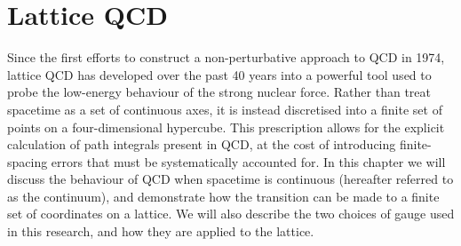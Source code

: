 
\chapter{Lattice QCD}

\ifpdf
    \graphicspath{{Chapter2/Figs/Raster/}{Chapter2/Figs/PDF/}{Chapter2/Figs/}}
\else
    \graphicspath{{Chapter2/Figs/Vector/}{Chapter2/Figs/}}
\fi
Since the first efforts to construct a non-perturbative approach to QCD in 1974\cite{Wilson:1974sk}, lattice QCD has developed over the past 40 years into a powerful tool used to probe the low-energy behaviour of the strong nuclear force. Rather than treat spacetime as a set of continuous axes, it is instead discretised into a finite set of points on a four-dimensional hypercube. This prescription allows for the explicit calculation of path integrals present in QCD, at the cost of introducing finite-spacing errors that must be systematically accounted for. In this chapter we will discuss the behaviour of QCD when spacetime is continuous (hereafter referred to as the continuum), and demonstrate how the transition can be made to a finite set of coordinates on a lattice. We will also describe the two choices of gauge used in this research, and how they are applied to the lattice. 

